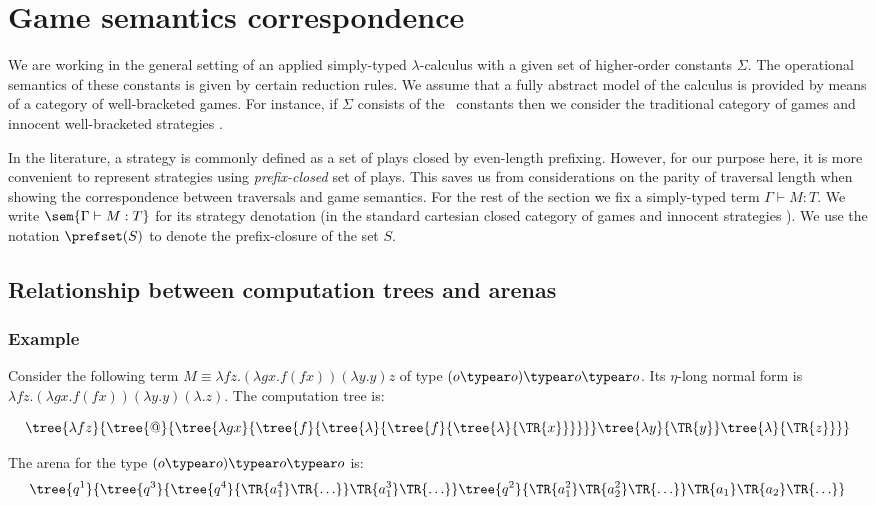 \section{Game semantics correspondence}
\label{sec:gamesemcorresp}

 We are working in the general setting of an applied
simply-typed $\lambda$-calculus with a given set of higher-order
constants $\Sigma$. The operational semantics of these constants is
given by certain reduction rules. We assume that a fully abstract
model of the calculus is provided by means of a category of
well-bracketed games. For instance, if $\Sigma$ consists
of the \pcf\ constants then we consider the traditional
category of games and innocent well-bracketed strategies
\cite{hylandong_pcf,abramsky94full}.


In the literature, a strategy is commonly defined as a set of plays closed by
even-length prefixing. However, for our purpose here, it is more convenient to represent strategies using \emph{prefix-closed} set of plays. This saves us from considerations on the parity of traversal length when
showing the correspondence between traversals and game semantics.
 For the rest of the section we fix a simply-typed term $\Gamma \vdash M :T$. We write $\sem{\Gamma \vdash M : T}$ for its strategy denotation (in the standard cartesian closed category of games and innocent strategies \cite{abramsky94full, hylandong_pcf}). We use the notation $\prefset(S)$ to denote the prefix-closure of the set $S$.

\subsection{Relationship between computation trees and arenas}

\subsubsection{Example}
Consider the following term $M \equiv \lambda f z . (\lambda g x . f (f x)) (\lambda y. y) z$ of type $(o \typear o) \typear o \typear o$.
Its $\eta$-long normal form is $\lambda f z . (\lambda g x . f (f x)) (\lambda y. y) (\lambda .z)$.
The computation tree is:

$$
\tree{\lambda f z}
{ \tree{@}
    {
        \tree{\lambda g x}
            { \tree{f}{   \tree{\lambda}{ \tree{f}{  \tree{\lambda}{\TR{x}}} }  }
            }
        \tree{\lambda y}{\TR{y}}
        \tree{\lambda}{\TR{z}}
    }
}
$$

The arena for the type $(o \typear o) \typear o \typear o$ is:
$$\tree{q^1}
{
    \tree{q^3}
        {  \tree{q^4}
                {\TR{a^4_1} \TR{\ldots}}
            \TR{a^3_1} \TR{\ldots} }
    \tree{q^2}
    { \TR{a^2_1} \TR{a^2_2}\TR{\ldots} }
    \TR{a_1} \TR{a_2}\TR{\ldots}
}
$$

